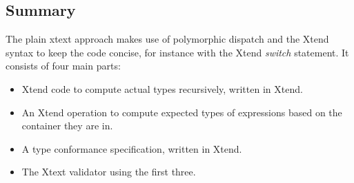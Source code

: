

\subsection{Summary}
The plain xtext approach makes use of polymorphic dispatch and the Xtend syntax to keep the code concise, for instance with the Xtend \emph{switch} statement. It consists of four main parts:
\begin{itemize}
\item Xtend code to compute actual types recursively, written in Xtend.
\item An Xtend operation to compute expected types of expressions based on the container they are in.
\item A type conformance specification, written in Xtend.
\item The Xtext validator using the first three.
\end{itemize}

